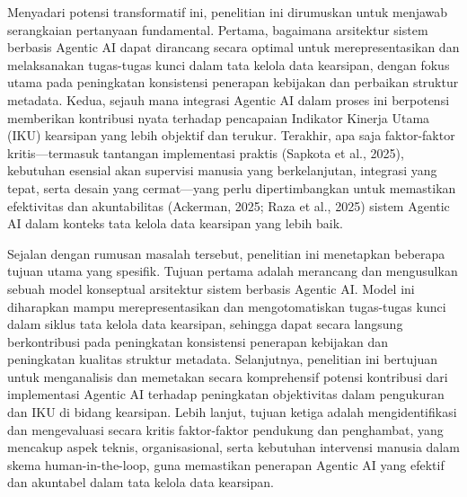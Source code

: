 Menyadari potensi transformatif ini, penelitian ini dirumuskan untuk
menjawab serangkaian pertanyaan fundamental. Pertama, bagaimana
arsitektur sistem berbasis Agentic AI dapat dirancang secara optimal
untuk merepresentasikan dan melaksanakan tugas-tugas kunci dalam tata
kelola data kearsipan, dengan fokus utama pada peningkatan konsistensi
penerapan kebijakan dan perbaikan struktur metadata. Kedua, sejauh mana
integrasi Agentic AI dalam proses ini berpotensi memberikan kontribusi
nyata terhadap pencapaian Indikator Kinerja Utama (IKU) kearsipan yang
lebih objektif dan terukur. Terakhir, apa saja faktor-faktor
kritis---termasuk tantangan implementasi praktis (Sapkota et al., 2025),
kebutuhan esensial akan supervisi manusia yang berkelanjutan, integrasi
yang tepat, serta desain yang cermat---yang perlu dipertimbangkan untuk
memastikan efektivitas dan akuntabilitas (Ackerman, 2025; Raza et al.,
2025) sistem Agentic AI dalam konteks tata kelola data kearsipan yang
lebih baik.

Sejalan dengan rumusan masalah tersebut, penelitian ini menetapkan
beberapa tujuan utama yang spesifik. Tujuan pertama adalah merancang dan
mengusulkan sebuah model konseptual arsitektur sistem berbasis Agentic
AI. Model ini diharapkan mampu merepresentasikan dan mengotomatiskan
tugas-tugas kunci dalam siklus tata kelola data kearsipan, sehingga
dapat secara langsung berkontribusi pada peningkatan konsistensi
penerapan kebijakan dan peningkatan kualitas struktur metadata.
Selanjutnya, penelitian ini bertujuan untuk menganalisis dan memetakan
secara komprehensif potensi kontribusi dari implementasi Agentic AI
terhadap peningkatan objektivitas dalam pengukuran dan IKU di bidang
kearsipan. Lebih lanjut, tujuan ketiga adalah mengidentifikasi dan
mengevaluasi secara kritis faktor-faktor pendukung dan penghambat, yang
mencakup aspek teknis, organisasional, serta kebutuhan intervensi
manusia dalam skema human-in-the-loop, guna memastikan penerapan Agentic
AI yang efektif dan akuntabel dalam tata kelola data kearsipan.

